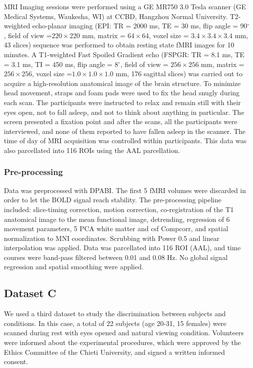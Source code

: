 \documentclass{article}
\begin{document}
MRI Imaging sessions were performed using a GE MR750 3.0 Tesla scanner (GE Medical Systems, Waukesha, WI) at CCBD, Hangzhou Normal University. T2-weighted echo-planar imaging (EPI: TR = 2000 ms, TE = 30 ms, flip angle = 90$^\circ$, field of view =$ 220 \times 220$ mm, matrix = $64 \times 64$, voxel size = $3.4 \times 3.4 \times 3.4$ mm, 43 slices) sequence was performed to obtain resting state fMRI images for 10 minutes. A T1-weighted Fast Spoiled Gradient echo (FSPGR: TR = 8.1 ms, TE = 3.1 ms, TI = 450 ms, flip angle = 8$^\circ$, field of view = $256 \times 256$ mm, matrix = $256 \times 256$, voxel size =$ 1.0 \times 1.0 \times 1.0$ mm, 176 sagittal slices) was carried out to acquire a high-resolution anatomical image of the brain structure. To minimize head movement, straps and foam pads were used to fix the head snugly during each scan. The participants were instructed to relax and remain still with their eyes open, not to fall asleep, and not to think about anything in particular. The screen presented a fixation point and after the scans, all the participants were interviewed, and none of them reported to have fallen asleep in the scanner. The time of day of MRI acquisition was controlled within participants. This data was also parcellated into 116 ROIs using the AAL parcellation.


\subsubsection{Pre-processing}

Data was preprocessed with DPABI. The first 5 fMRI volumes were discarded in order to let the BOLD signal reach stability. The pre-processing pipeline included: slice-timing correction, motion correction, co-registration of the T1 anatomical image to the mean functional image, detrending, regression of 6 movement parameters, 5 PCA white matter and csf Compcorr, and spatial normalization to MNI coordinates. Scrubbing with Power 0.5 and linear interpolation was applied. Data was parcellated into 116 ROI (AAL), and time courses were band-pass filtered between 0.01 and 0.08 Hz. No global signal regression and spatial smoothing were applied. 

\subsection{Dataset C}

We used a third dataset to study the discrimination between subjects and conditions. In this case, a total of 22 subjects (age 20-31, 15 females) were scanned during rest with eyes opened and natural viewing condition. Volunteers were informed about the experimental procedures, which were approved by the Ethics Committee of the Chieti University, and signed a written informed consent.
\end{document}
